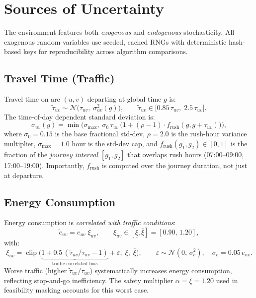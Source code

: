 \documentclass[11pt]{article}
\begin{document}
\section{Sources of Uncertainty}\label{sec:uncertainty}

The environment features both \emph{exogenous} and \emph{endogenous} stochasticity. All exogenous random variables use seeded, cached RNGs with deterministic hash-based keys for reproducibility across algorithm comparisons.

\subsection{Travel Time (Traffic)}

Travel time on arc $(u,v)$ departing at global time $g$ is:
\[
\tilde{\tau}_{uv} \sim \mathcal{N}\!\Big(\tau_{uv},\;\sigma_{uv}^2(g)\Big), \qquad \tilde{\tau}_{uv} \in \big[0.85\,\tau_{uv},\; 2.5\,\tau_{uv}\big].
\]
The time-of-day dependent standard deviation is:
\[
\sigma_{uv}(g) = \min\!\Big(\sigma_{\max},\; \sigma_0\,\tau_{uv}\,\big(1 + (\rho-1)\cdot f_{\text{rush}}(g, g+\tau_{uv})\big)\Big),
\]
where $\sigma_0=0.15$ is the base fractional std-dev, $\rho=2.0$ is the rush-hour variance multiplier, $\sigma_{\max}=1.0$ hour is the std-dev cap, and $f_{\text{rush}}(g_1,g_2)\in[0,1]$ is the fraction of the \emph{journey interval} $[g_1,g_2]$ that overlaps rush hours (07:00--09:00, 17:00--19:00). Importantly, $f_{\text{rush}}$ is computed over the journey duration, not just at departure.

\subsection{Energy Consumption}

Energy consumption is \emph{correlated with traffic conditions}:
\[
\tilde{e}_{uv} = e_{uv}\;\xi_{uv}, \qquad \xi_{uv}\in[\underline{\xi},\overline{\xi}] = [0.90,\,1.20],
\]
with:
\[
\xi_{uv} = \operatorname{clip}\!\Big(\underbrace{1 + 0.5\,(\tilde{\tau}_{uv}/\tau_{uv} - 1)}_{\text{traffic-correlated bias}} + \varepsilon ,\; \underline{\xi},\;\overline{\xi}\Big), \qquad \varepsilon\sim\mathcal{N}(0,\,\sigma_e^2), \quad \sigma_e = 0.05\,e_{uv}.
\]
Worse traffic (higher $\tilde{\tau}_{uv}/\tau_{uv}$) systematically increases energy consumption, reflecting stop-and-go inefficiency. The safety multiplier $\alpha=\overline{\xi}=1.20$ used in feasibility masking accounts for this worst case.
\end{document}

